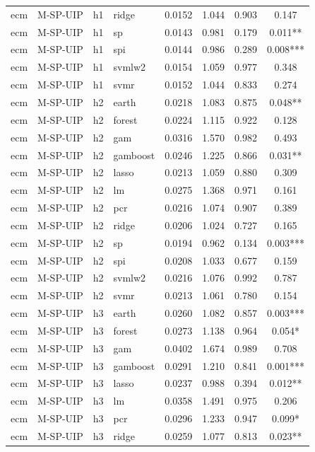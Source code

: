 \begin{ThreePartTable}
\begin{longtable}[t]{llclcccc}
ecm & M-SP-UIP & h1 & ridge & 0.0152 & 1.044 & 0.903 & 0.147\\
ecm & M-SP-UIP & h1 & sp & 0.0143 & 0.981 & 0.179 & 0.011**\\
ecm & M-SP-UIP & h1 & spi & 0.0144 & 0.986 & 0.289 & 0.008***\\
ecm & M-SP-UIP & h1 & svmlw2 & 0.0154 & 1.059 & 0.977 & 0.348\\
ecm & M-SP-UIP & h1 & svmr & 0.0152 & 1.044 & 0.833 & 0.274\\
\addlinespace
ecm & M-SP-UIP & h2 & earth & 0.0218 & 1.083 & 0.875 & 0.048**\\
ecm & M-SP-UIP & h2 & forest & 0.0224 & 1.115 & 0.922 & 0.128\\
ecm & M-SP-UIP & h2 & gam & 0.0316 & 1.570 & 0.982 & 0.493\\
ecm & M-SP-UIP & h2 & gamboost & 0.0246 & 1.225 & 0.866 & 0.031**\\
ecm & M-SP-UIP & h2 & lasso & 0.0213 & 1.059 & 0.880 & 0.309\\
ecm & M-SP-UIP & h2 & lm & 0.0275 & 1.368 & 0.971 & 0.161\\
ecm & M-SP-UIP & h2 & pcr & 0.0216 & 1.074 & 0.907 & 0.389\\
ecm & M-SP-UIP & h2 & ridge & 0.0206 & 1.024 & 0.727 & 0.165\\
ecm & M-SP-UIP & h2 & sp & 0.0194 & 0.962 & 0.134 & 0.003***\\
ecm & M-SP-UIP & h2 & spi & 0.0208 & 1.033 & 0.677 & 0.159\\
ecm & M-SP-UIP & h2 & svmlw2 & 0.0216 & 1.076 & 0.992 & 0.787\\
ecm & M-SP-UIP & h2 & svmr & 0.0213 & 1.061 & 0.780 & 0.154\\
\addlinespace
ecm & M-SP-UIP & h3 & earth & 0.0260 & 1.082 & 0.857 & 0.003***\\
ecm & M-SP-UIP & h3 & forest & 0.0273 & 1.138 & 0.964 & 0.054*\\
ecm & M-SP-UIP & h3 & gam & 0.0402 & 1.674 & 0.989 & 0.708\\
ecm & M-SP-UIP & h3 & gamboost & 0.0291 & 1.210 & 0.841 & 0.001***\\
ecm & M-SP-UIP & h3 & lasso & 0.0237 & 0.988 & 0.394 & 0.012**\\
ecm & M-SP-UIP & h3 & lm & 0.0358 & 1.491 & 0.975 & 0.206\\
ecm & M-SP-UIP & h3 & pcr & 0.0296 & 1.233 & 0.947 & 0.099*\\
ecm & M-SP-UIP & h3 & ridge & 0.0259 & 1.077 & 0.813 & 0.023**\\

\end{longtable}
\end{ThreePartTable}
